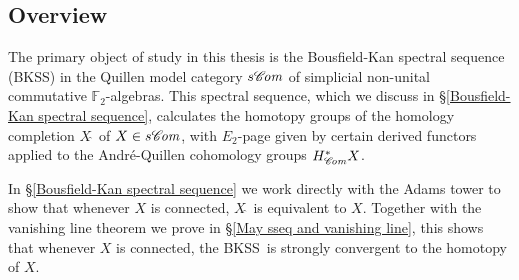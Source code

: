 \documentclass[11pt]{amsart} \renewcommand{\baselinestretch}{1.2}
\theoremstyle{plain}
\numberwithin{equation}{section} %
\theoremstyle{plain}
\numberwithin{equation}{chapter} %
\newcommand{\scrC}{\mathscr{C}}
\newcommand{\calw}{\mathcal{W}}
\newcommand{\calu}{\mathcal{U}}
\newcommand{\F}{\mathbb{F}}
\newcommand{\algs}{{\scrC\!\textit{\normalfont\textit{om}}}}
\newcommand{\Ftwo}{\F_2}
\newcommand{\BKSS}{BKSS}
\newcommand{\SubsectionOrSection}[1]{\subsection{#1}}
\begin{document}
\begin{Introduction}




\SubsectionOrSection{Overview}
The primary object of study in this thesis is the Bousfield-Kan spectral sequence (\BKSS) in the Quillen model category $s\algs$ of simplicial non-unital commutative  $\Ftwo$-algebras. This spectral sequence, which we discuss in \S\ref{Bousfield-Kan spectral sequence}, calculates the homotopy groups of the homology completion $X\hat{\ }$ of $X\in s\algs$, with $E_2$-page given by certain derived functors applied to the Andr\'e-Quillen cohomology groups $H^*_{\algs}X$. 

In \S\ref{Bousfield-Kan spectral sequence} we work directly with the Adams tower to show that whenever $X$ is connected, $X\hat{\ }$ is  equivalent to $X$. Together with the vanishing line theorem we prove in \S\ref{May sseq and vanishing line}, this shows that whenever $X$ is connected, the \BKSS\ is strongly convergent to the homotopy of $X$. 


\end{Introduction}
\end{document}
